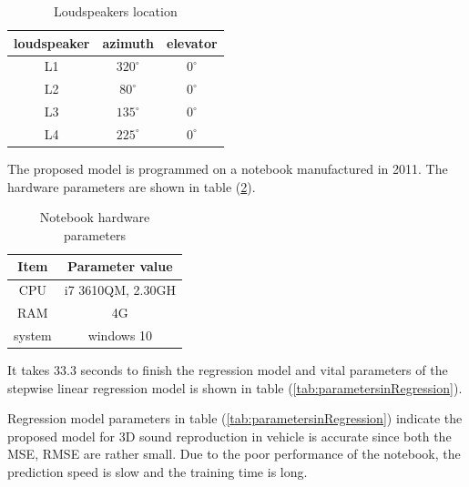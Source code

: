 \documentclass[runningheads,a4paper]{llncs}
\begin{document}
\begin{table}[htbp]
  \caption{\label{tab:LPLocation}Loudspeakers location}
  \centering
  \begin{tabular}{|c | c| c|}
    \hline
    loudspeaker           & azimuth     & elevator        \\
    \hline
    L1                 & $320^{\circ}$     & $0^{\circ}$    \\
    L2                 & $80^{\circ}$       & $0^{\circ}$    \\
    L3                 & $135^{\circ}$     & $0^{\circ}$      \\
    L4                 & $225^{\circ}$     & $0^{\circ}$       \\
    \hline
  \end{tabular}
\end{table}


The proposed model is programmed on a notebook manufactured in 2011. The hardware parameters are shown in table (\ref{tab:Hardware}).

\begin{table}[htbp]
    \caption{\label{tab:Hardware} Notebook hardware parameters}
    \centering
    \begin{tabular}{|c | c|}
      \hline
      Item           & Parameter value             \\
      \hline
      CPU                 & i7 3610QM, 2.30GH       \\
      RAM                 & 4G       \\
      system                 & windows 10     \\
      \hline
    \end{tabular}
\end{table}



It takes 33.3 seconds to finish the regression model and vital parameters of the stepwise linear regression model is shown in table (\ref{tab:parametersinRegression}).

Regression model parameters in table (\ref{tab:parametersinRegression}) indicate the proposed model for 3D sound reproduction in vehicle is accurate since both the MSE, RMSE are rather small. Due to the poor performance of the notebook, the prediction speed is slow and the training time is long.
\end{document}
